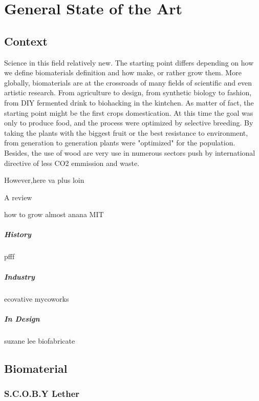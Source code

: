 \chapter{General State of the Art}


\section{Context}
Science in this field relatively new. The starting point differs depending on how we define biomaterials definition and how make, or rather grow them. 
More globally, biomaterials are at the crossroads of many fields of scientific and even artistic research. From agriculture to design, from synthetic biology to fashion, from DIY fermented drink to biohacking in the kintchen.
As matter of fact, the starting point might be the first crops domestication. At this time the goal was only to produce food, and the process were optimized by selective breeding. By taking the plants with the biggest fruit or the best resistance to environment, from generation to generation plants were "optimized" for the population.
Besides, the use of wood are very use in numerous sectors\cite{ramage2017wood} push by international directive of less CO2 emmission and waste. 

However,here va plus loin 

A review 

how to grow almost anana MIT 

\paragraph[short]{History} 
pfff 
\paragraph[short]{Industry} 
ecovative mycoworks 

\paragraph[short]{In Design} 

suzane lee biofabricate 




\section{Biomaterial}
\subsection{S.C.O.B.Y Lether} 



